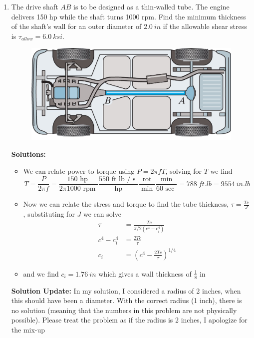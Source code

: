 \documentclass[12pt, oneside]{article}
\let\US\SI
\begin{document}
\begin{enumerate}
	\item %
		The drive shaft $AB$ is to be designed as a thin-walled tube.
		The engine delivers 150 hp while the shaft turns 1000 rpm.
		Find the minimum thickness of the shaft's wall for an outer diameter of $\US{2.0}{in}$ if the allowable shear stress is $\tau_{allow}=\US{6.0}{ksi}$.
		\begin{figure}[H]
			\centering
			\includegraphics[width=0.6\linewidth]{5-28}
		\end{figure}
		\textbf{Solutions:}
		\begin{itemize}
			\item We can relate power to torque using $P = 2\pi f T$, solving for $T$ we find
				\begin{equation*}
					T = \frac{P}{2\pi f} = \frac{ 150 \text{ hp } }{ 2 \pi 1000 \text{ rpm } } \frac{ 550 \text{ ft lb / s } }{ \text { hp } } \frac{ \text{ rot } }{ \text{ min } } \frac{ \text{ min } }{ 60 \text{ sec } } = \US{788}{ft.lb} = \US{9554}{in.lb}
				\end{equation*}
			\item Now we can relate the stress and torque to find the tube thickness, $\tau = \frac{Tc}{J}$, substituting for $J$ we can solve
				\begin{align*}
					\tau &= \frac{Tc}{\pi/2 (c^4 - c_i^4)}\\
					c^4 - c_i^4 &= \frac{2 T c}{\tau}\\
					c_i &= \left( c^4 - \frac{2 T c}{\tau} \right)^{1/4}
				\end{align*}
			\item and we find $c_i = \US{1.76}{in}$ which gives a wall thickness of $\frac{1}{8}\text{ in}$
		\end{itemize}
		\textbf{Solution Update:} In my solution, I considered a radius of 2 inches, when this should have been a diameter. With the correct radius (1 inch), there is no solution (meaning that the numbers in this problem are not physically possible). Please treat the problem as if the radius is 2 inches, I apologize for the mix-up


\end{enumerate}
\end{document}
